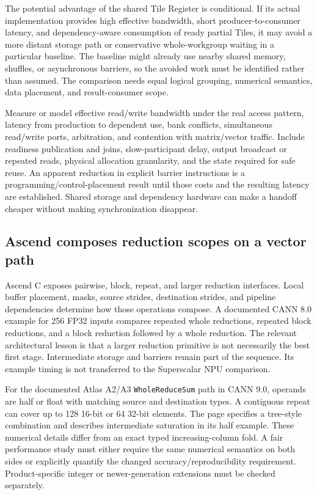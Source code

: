 The potential advantage of the shared Tile Register is conditional. If its actual implementation provides high effective bandwidth, short producer-to-consumer latency, and dependency-aware consumption of ready partial Tiles, it may avoid a more distant storage path or conservative whole-workgroup waiting in a particular baseline. The baseline might already use nearby shared memory, shuffles, or asynchronous barriers, so the avoided work must be identified rather than assumed. The comparison needs equal logical grouping, numerical semantics, data placement, and result-consumer scope.

Measure or model effective read/write bandwidth under the real access pattern, latency from production to dependent use, bank conflicts, simultaneous read/write ports, arbitration, and contention with matrix/vector traffic. Include readiness publication and joins, slow-participant delay, output broadcast or repeated reads, physical allocation granularity, and the state required for safe reuse. An apparent reduction in explicit barrier instructions is a programming/control-placement result until those costs and the resulting latency are established. Shared storage and dependency hardware can make a handoff cheaper without making synchronization disappear.

\subsection{Ascend composes reduction scopes on a vector path}

Ascend C exposes pairwise, block, repeat, and larger reduction interfaces. Local buffer placement, masks, source strides, destination strides, and pipeline dependencies determine how those operations compose. A documented CANN 8.0 example for 256 FP32 inputs compares repeated whole reductions, repeated block reductions, and a block reduction followed by a whole reduction. The relevant architectural lesson is that a larger reduction primitive is not necessarily the best first stage. Intermediate storage and barriers remain part of the sequence. Its example timing is not transferred to the Superscalar NPU comparison.~\citep{u005-ascend-composition}

For the documented Atlas A2/A3 \texttt{WholeReduceSum} path in CANN 9.0, operands are half or float with matching source and destination types. A contiguous repeat can cover up to 128 16-bit or 64 32-bit elements. The page specifies a tree-style combination and describes intermediate saturation in its half example. These numerical details differ from an exact typed increasing-column fold. A fair performance study must either require the same numerical semantics on both sides or explicitly quantify the changed accuracy/reproducibility requirement. Product-specific integer or newer-generation extensions must be checked separately.~\citep{u005-ascend-whole}

